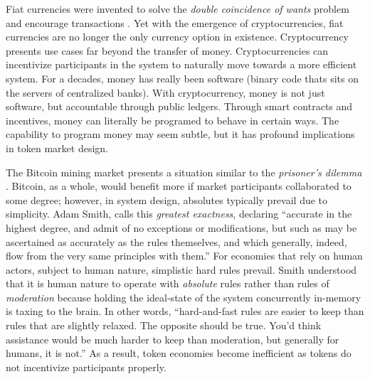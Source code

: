 \documentclass{article}
\begin{document}
Fiat currencies were invented to solve the \textit{double coincidence of wants} problem and encourage transactions \cite{freeman-fiatmoney}. Yet with the emergence of cryptocurrencies, fiat currencies are no longer the only currency option in existence. Cryptocurrency presents use cases far beyond the transfer of money. Cryptocurrencies can incentivize participants in the system to naturally move towards a more efficient system. For a decades, money has really been software (binary code thats sits on the servers of centralized banks). With cryptocurrency, money is not just software, but accountable through public ledgers. Through smart contracts and incentives, money can literally be programed to behave in certain ways. The capability to program money may seem subtle, but it has profound implications in token market design.

The Bitcoin mining market presents a situation similar to the \textit{prisoner's dilemma} \cite{lave-prisonersdilemma}. Bitcoin, as a whole, would benefit more if market participants collaborated to some degree; however, in system design, absolutes typically prevail due to simplicity. Adam Smith, calls this \textit{greatest exactness}, declaring ``accurate in the highest degree, and admit of no exceptions or modifications, but such as may be ascertained as accurately as the rules themselves, and which generally, indeed, flow from the very same principles with them.''\cite{smith-sentiments} For economies that rely on human actors, subject to human nature, simplistic hard rules prevail. Smith understood that it is human nature to operate with \textit{absolute} rules rather than rules of \textit{moderation} because holding the ideal-state of the system concurrently in-memory is taxing to the brain. In other words, ``hard-and-fast rules are easier to keep than rules that are slightly relaxed. The opposite should be true. You'd think assistance would be much harder to keep than moderation, but generally for humans, it is not.''\cite{roberts-howadamsmith} As a result, token economies become inefficient as tokens do not incentivize participants properly.
\end{document}
